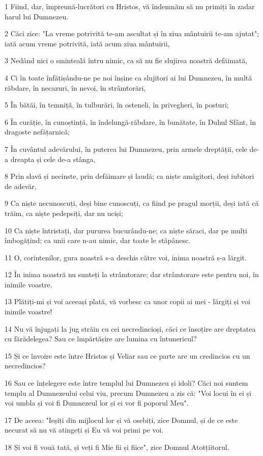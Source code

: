 \par 1 Fiind, dar, împreună-lucrători cu Hristos, vă îndemnăm să nu primiți în zadar harul lui Dumnezeu.
\par 2 Căci zice: "La vreme potrivită te-am ascultat și în ziua mântuirii te-am ajutat"; iată acum vreme potrivită, iată acum ziua mântuirii,
\par 3 Nedând nici o sminteală întru nimic, ca să nu fie slujirea noastră defăimată,
\par 4 Ci în toate înfățișându-ne pe noi înșine ca slujitori ai lui Dumnezeu, în multă răbdare, în necazuri, în nevoi, în strâmtorări,
\par 5 În bătăi, în temniță, în tulburări, în osteneli, în privegheri, în posturi;
\par 6 În curăție, în cunoștință, în îndelungă-răbdare, în bunătate, în Duhul Sfânt, în dragoste nefățarnică;
\par 7 În cuvântul adevărului, în puterea lui Dumnezeu, prin armele dreptății, cele de-a dreapta și cele de-a stânga,
\par 8 Prin slavă și necinste, prin defăimare și laudă; ca niște amăgitori, deși iubitori de adevăr,
\par 9 Ca niște necunoscuți, deși bine cunoscuți, ca fiind pe pragul morții, deși iată că trăim, ca niște pedepsiți, dar nu uciși;
\par 10 Ca niște întristați, dar pururea bucurându-ne; ca niște săraci, dar pe mulți îmbogățind; ca unii care n-au nimic, dar toate le stăpânesc.
\par 11 O, corintenilor, gura noastră s-a deschis către voi, inima noastră s-a lărgit.
\par 12 În inima noastră nu sunteți la strâmtorare; dar strâmtorare este pentru noi, în inimile voastre.
\par 13 Plătiți-mi și voi aceeași plată, vă vorbesc ca unor copii ai mei - lărgiți și voi inimile voastre!
\par 14 Nu vă înjugați la jug străin cu cei necredincioși, căci ce însoțire are dreptatea cu fărădelegea? Sau ce împărtășire are lumina cu întunericul?
\par 15 Și ce învoire este între Hristos și Veliar sau ce parte are un credincios cu un necredincios?
\par 16 Sau ce înțelegere este între templul lui Dumnezeu și idoli? Căci noi suntem templu al Dumnezeului celui viu, precum Dumnezeu a zis că: "Voi locui în ei și voi umbla și voi fi Dumnezeul lor și ei vor fi poporul Meu".
\par 17 De aceea: "Ieșiți din mijlocul lor și vă osebiți, zice Domnul, și de ce este necurat să nu vă atingeți și Eu vă voi primi pe voi.
\par 18 Și voi fi vouă tată, și veți fi Mie fii și fiice", zice Domnul Atotțiitorul.

